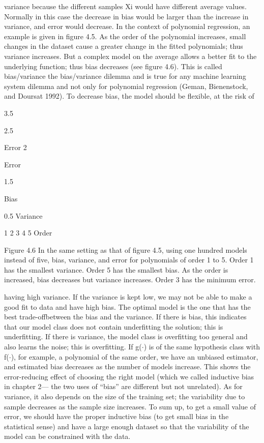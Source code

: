variance because the different samples Xi would have different average values. Normally in this case the decrease in bias would be larger than the increase in variance, and error would decrease. In the context of polynomial regression, an example is given in figure 4.5. As the order of the polynomial increases, small changes in the dataset cause a greater change in the fitted polynomials; thus variance increases. But a complex model on the average allows a better fit to the underlying function; thus bias decreases (see figure 4.6). This is called bias/variance the bias/variance dilemma and is true for any machine learning system dilemma and not only for polynomial regression (Geman, Bienenstock, and Doursat 1992). To decrease bias, the model should be flexible, at the risk of

3.5

2.5

Error 2

Error

1.5

Bias

0.5 Variance

1 2 3 4 5 Order

Figure 4.6 In the same setting as that of figure 4.5, using one hundred models instead of five, bias, variance, and error for polynomials of order 1 to 5. Order 1 has the smallest variance. Order 5 has the smallest bias. As the order is increased, bias decreases but variance increases. Order 3 has the minimum error.

having high variance. If the variance is kept low, we may not be able to make a good fit to data and have high bias. The optimal model is the one that has the best trade-offbetween the bias and the variance. If there is bias, this indicates that our model class does not contain underfitting the solution; this is underfitting. If there is variance, the model class is overfitting too general and also learns the noise; this is overfitting. If g($\cdot$) is of the same hypothesis class with f($\cdot$), for example, a polynomial of the same order, we have an unbiased estimator, and estimated bias decreases as the number of models increase. This shows the error-reducing effect of choosing the right model (which we called inductive bias in chapter 2--- the two uses of “bias” are different but not unrelated). As for variance, it also depends on the size of the training set; the variability due to sample decreases as the sample size increases. To sum up, to get a small value of error, we should have the proper inductive bias (to get small bias in the statistical sense) and have a large enough dataset so that the variability of the model can be constrained with the data.

